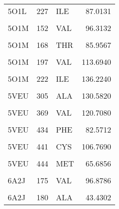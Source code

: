 \begin{table}
\begin{tabular}{lrlr}
			5O1L & 227 & ILE & 87.0131\\
			\cellcolor{gray!6}{5O1L} & \cellcolor{gray!6}{230} & \cellcolor{gray!6}{THR} & \cellcolor{gray!6}{168.0670}\\
			\addlinespace
			5O1M & 152 & VAL & 96.3132\\
			\cellcolor{gray!6}{5O1M} & \cellcolor{gray!6}{167} & \cellcolor{gray!6}{LYS} & \cellcolor{gray!6}{134.4970}\\
			5O1M & 168 & THR & 85.9567\\
			\cellcolor{gray!6}{5O1M} & \cellcolor{gray!6}{194} & \cellcolor{gray!6}{THR} & \cellcolor{gray!6}{101.5220}\\
			5O1M & 197 & VAL & 113.6940\\
			\addlinespace
			\cellcolor{gray!6}{5O1M} & \cellcolor{gray!6}{198} & \cellcolor{gray!6}{HIS} & \cellcolor{gray!6}{100.3070}\\
			5O1M & 222 & ILE & 136.2240\\
			\cellcolor{gray!6}{5O1M} & \cellcolor{gray!6}{230} & \cellcolor{gray!6}{THR} & \cellcolor{gray!6}{174.9180}\\
			5VEU & 305 & ALA & 130.5820\\
			\cellcolor{gray!6}{5VEU} & \cellcolor{gray!6}{309} & \cellcolor{gray!6}{THR} & \cellcolor{gray!6}{174.8590}\\
			\addlinespace
			5VEU & 369 & VAL & 120.7080\\
			\cellcolor{gray!6}{5VEU} & \cellcolor{gray!6}{433} & \cellcolor{gray!6}{PRO} & \cellcolor{gray!6}{65.9573}\\
			5VEU & 434 & PHE & 82.5712\\
			\cellcolor{gray!6}{5VEU} & \cellcolor{gray!6}{440} & \cellcolor{gray!6}{ASN} & \cellcolor{gray!6}{56.4019}\\
			5VEU & 441 & CYS & 106.7690\\
			\addlinespace
			\cellcolor{gray!6}{5VEU} & \cellcolor{gray!6}{442} & \cellcolor{gray!6}{ILE} & \cellcolor{gray!6}{59.4678}\\
			5VEU & 444 & MET & 65.6856\\
			\cellcolor{gray!6}{5VEU} & \cellcolor{gray!6}{447} & \cellcolor{gray!6}{ALA} & \cellcolor{gray!6}{149.4040}\\
			6A2J & 175 & VAL & 96.8786\\
			\cellcolor{gray!6}{6A2J} & \cellcolor{gray!6}{178} & \cellcolor{gray!6}{THR} & \cellcolor{gray!6}{86.8748}\\
			\addlinespace
			6A2J & 180 & ALA & 43.4302\\

\end{tabular}
\end{table}
